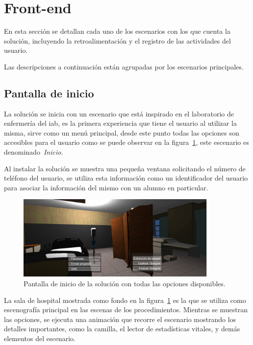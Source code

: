 \section{Front-end}

En esta sección se detallan cada uno de los escenarios con los que cuenta 
la solución, incluyendo la retroalimentación y el registro de las actividades del 
usuario.

Las descripciones a continuación están agrupadas por los escenarios principales.

\subsection{Pantalla de inicio}

La solución se inicia con un escenario que está inspirado en el laboratorio de
enfermería del \Gls{iab}, es la primera experiencia que tiene el usuario al
utilizar la misma, sirve como un menú principal, desde este punto todas las
opciones son accesibles para el usuario como se puede observar en la
figura~\ref{fig:pantalla_inicio}, este escenario es denominado~\emph{Inicio}.

Al instalar la solución se muestra una pequeña ventana solicitando el número de
teléfono del usuario, se utiliza esta información como un identificador del
usuario para asociar la información del mismo con un alumno en
particular.

\begin{figure}[H] 
\centering 
\includegraphics[width=10cm]{solucion/images/pantalla_inicio.jpg}
\caption{Pantalla de inicio de la solución con todas las opciones disponibles.}
\label{fig:pantalla_inicio}
\end{figure}

La sala de hospital mostrada como fondo en la figura~\ref{fig:pantalla_inicio}
es la que se utiliza como escenografía principal en las escenas de los
procedimientos. Mientras se muestran las opciones, se ejecuta una animación que
recorre el escenario mostrando los detalles importantes, como la camilla, el
lector de estadísticas vitales, y demás elementos del escenario.

